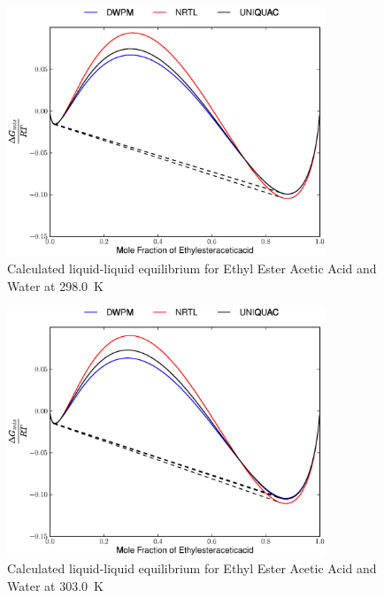 \begin{figure}[hp]
\centering
\includegraphics[width = 0.85\textwidth]{Results_Parts/BinaryParams/ethylesteraceticacid-water/AllModelsGibbsPlots/T_298.0.eps}
\caption{Calculated liquid-liquid equilibrium for Ethyl Ester Acetic Acid and Water at 298.0~$\mathrm{K}$}
\end{figure}

\begin{figure}[hp]
\centering
\includegraphics[width = 0.85\textwidth]{Results_Parts/BinaryParams/ethylesteraceticacid-water/AllModelsGibbsPlots/T_303.0.eps}
\caption{Calculated liquid-liquid equilibrium for Ethyl Ester Acetic Acid and Water at 303.0~$\mathrm{K}$}
\end{figure}

